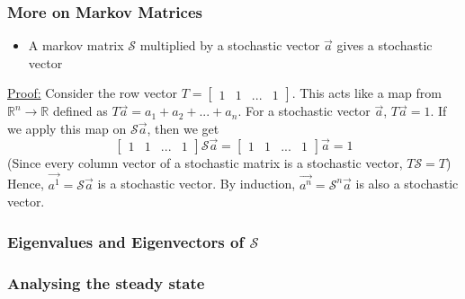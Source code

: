 \documentclass{beamer}
\begin{document}
\begin{frame}[t]\frametitle{More on Markov Matrices}
\begin{itemize}
	\item A markov matrix $\mathcal{S}$ multiplied by a stochastic vector $\vec{a}$ gives a stochastic vector
\end{itemize}
\underline{Proof:} Consider the row vector $T = \begin{bmatrix} 1 & 1 & ... & 1 \end{bmatrix}$.
This acts like a map from $\mathbb{R}^n \to \mathbb{R}$ defined as $T\vec{a} = a_1 + a_2 + ... + a_n$.
For a stochastic vector $\vec{a}$, $T\vec{a} = 1$. If we apply this map on $\mathcal{S}\vec{a}$, 
then we get 
$$\begin{bmatrix} 1 & 1 & ... & 1 \end{bmatrix} \mathcal{S} \vec{a} = \begin{bmatrix} 1 & 1 & ... & 1 \end{bmatrix} \vec{a} = 1$$
(Since every column vector of a stochastic matrix is a stochastic vector, 
$T\mathcal{S} = T$) \\
\vspace{2em}
Hence, $\vec{a^1} = \mathcal{S}\vec{a}$ is a stochastic vector. By induction, 
$\vec{a^n} = \mathcal{S}^n\vec{a}$ is also a stochastic vector.
\end{frame}

\begin{frame}[t]\frametitle{Eigenvalues and Eigenvectors of $\mathcal{S}$}
\end{frame}


\begin{frame}[t]\frametitle{Analysing the steady state}
\end{frame}
\end{document}
